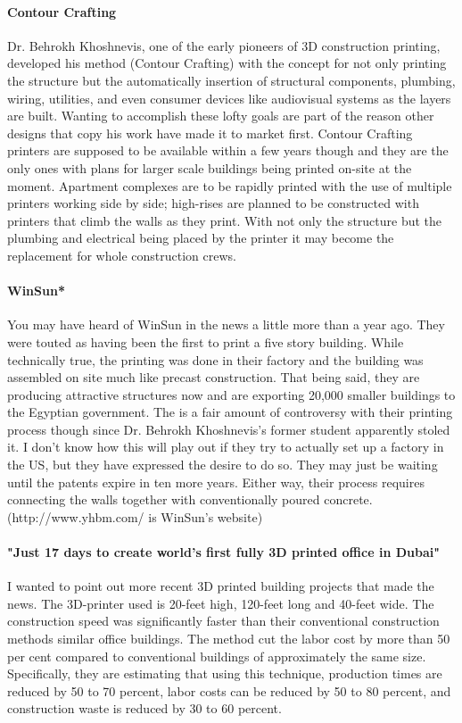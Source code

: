 \documentclass[11pt]{article}
\begin{document}
\paragraph{Contour Crafting}
Dr. Behrokh Khoshnevis, one of the early pioneers of 3D construction printing, developed his method (Contour Crafting) with the concept for not only printing the structure but the automatically insertion of structural components, plumbing, wiring, utilities, and even consumer devices like audiovisual systems as the layers are built. Wanting to accomplish these lofty goals are part of the reason other designs that copy his work have made it to market first.  Contour Crafting printers are supposed to be available within a few years though and they are the only ones with plans for larger scale buildings being printed on-site at the moment.  Apartment complexes are to be rapidly printed with the use of multiple printers working side by side; high-rises are planned to be constructed with printers that climb the walls as they print. With not only the structure but the plumbing and electrical being placed by the printer it may become the replacement for whole construction crews.
\paragraph{WinSun*}
You may have heard of WinSun in the news a little more than a year ago.  They were touted as having been the first to print a five story building.  While technically true, the printing was done in their factory and the building was assembled on site much like precast construction.  That being said, they are producing attractive structures now and are exporting 20,000 smaller buildings to the Egyptian government.  The is a fair amount of controversy with their printing process though since Dr. Behrokh Khoshnevis's former student apparently stoled it.  I don't know how this will play out if they try to actually set up a factory in the US, but they have expressed the desire to do so.  They may just be waiting until the patents expire in ten more years.  Either way, their process requires connecting the walls together with conventionally poured concrete.  (http://www.yhbm.com/ is WinSun's website)
\paragraph{"Just 17 days to create world’s first fully 3D printed office in Dubai"}
I wanted to point out more recent 3D printed building projects that made the news.  The 3D-printer used is 20-feet high, 120-feet long and 40-feet wide.  The construction speed was significantly faster than their conventional construction methods similar office buildings. The method cut the labor cost by more than 50 per cent compared to conventional buildings of approximately the same size.  Specifically, they are estimating that using this technique, production times are reduced by 50 to 70 percent, labor costs can be reduced by 50 to 80 percent, and construction waste is reduced by 30 to 60 percent.
\end{document}
